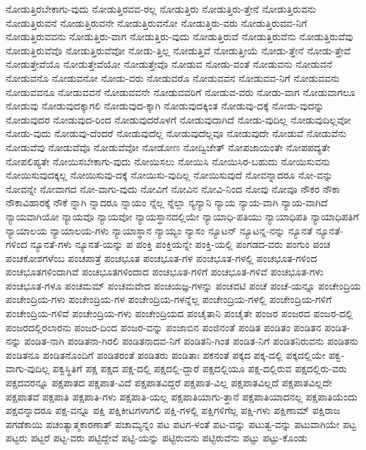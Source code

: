 {ನೋಡುತ್ತಿರಬೇಕಾಗು-ವುದು
ನೋಡುತ್ತಿರವವ-ರಲ್ಲ
ನೋಡುತ್ತಿರು
ನೋಡುತ್ತಿರು-ತ್ತೇನೆ
ನೋಡುತ್ತಿರುವನು
ನೋಡುತ್ತಿರುವನೆ
ನೋಡುತ್ತಿರುವನೇ
ನೋಡುತ್ತಿರುವನೋ
ನೋಡುತ್ತಿರು-ವರು
ನೋಡುತ್ತಿರುವವ-ನಿಗೆ
ನೋಡುತ್ತಿರುವವನು
ನೋಡುತ್ತಿರು-ವಾಗ
ನೋಡುತ್ತಿರು-ವುದು
ನೋಡುತ್ತಿರುವೆ
ನೋಡುತ್ತಿರುವೆನು
ನೋಡುತ್ತಿರುವೆವು
ನೋಡುತ್ತಿರುವೆವೊ
ನೋಡುತ್ತಿರುವೆವೋ
ನೋಡು-ತ್ತಿಲ್ಲ
ನೋಡುತ್ತಿವೆ
ನೋಡುತ್ತೀಯೆ
ನೋಡು-ತ್ತೇನೆ
ನೋಡು-ತ್ತೇವೆ
ನೋಡುತ್ತೇವೆಯೊ
ನೋಡುತ್ತೇವೆಯೋ
ನೋಡುತ್ತೇವೊ
ನೋಡುವ
ನೋಡು-ವಂತೆ
ನೋಡುವನು
ನೋಡುವನೆ
ನೋಡುವನೊ
ನೋಡುವನೋ
ನೋಡು-ವರು
ನೋಡುವರೊ
ನೋಡುವವನ
ನೋಡುವವ-ನಿಗೆ
ನೋಡುವವನು
ನೋಡುವವನೂ
ನೋಡುವವನೆ
ನೋಡುವವನೇ
ನೋಡುವವರಿಗೆ
ನೋಡುವ-ವರು
ನೋಡು-ವಾಗ
ನೋಡುವಾಗಲೂ
ನೋಡುವು
ನೋಡುವುದಕ್ಕಾಗಲಿ
ನೋಡುವುದ-ಕ್ಕಾಗಿ
ನೋಡುವುದಕ್ಕಿಂತ
ನೋಡುವು-ದಕ್ಕೆ
ನೋಡು-ವುದನ್ನು
ನೋಡುವುದರ
ನೋಡುವುದ-ರಿಂದ
ನೋಡುವುದರೊಳಗೆ
ನೋಡುವುದಾಗಿದೆ
ನೋಡು-ವುದಿಲ್ಲ
ನೋಡುವುದಿಲ್ಲವೋ
ನೋಡು-ವುದು
ನೋಡುವು-ದೆಂದರೆ
ನೋಡುವುದೆಲ್ಲ
ನೋಡುವುದೆಲ್ಲವೂ
ನೋಡುವುದೇ
ನೋಡುವೆ
ನೋಡುವೆನು
ನೋಡುವೆವು
ನೋಡುವೆವೊ
ನೋಡುವೆವೋ
ನೋಡೋಣ
ನೋದ್ವಿಜೇತ್
ನೋಪಜಾಯಂತೇ
ನೋಪಪದ್ಯತೇ
ನೋಪಲಿಪ್ಯತೇ
ನೋಯಿಸಬೇಕಾಗು-ವುದು
ನೋಯಿಸಲು
ನೋಯಿಸಿ
ನೋಯಿಸಿರ-ಬಹುದು
ನೋಯಿಸುವನು
ನೋಯಿಸುವುದಕ್ಕಲ್ಲ
ನೋಯಿಸುವು-ದಕ್ಕೆ
ನೋಯಿಸು-ವುದಿಲ್ಲ
ನೋಯಿಸುವುದೆ
ನೋವನ್ನಾದರೂ
ನೋ-ವನ್ನು
ನೋವನ್ನೇ
ನೋವಾಗದ
ನೋ-ವಾಗು-ವುದು
ನೋವಿಗೆ
ನೋವಿನ
ನೋವಿ-ನಿಂದ
ನೋವು
ನೋವೂ
ನೌಕರ
ನೌಕಾ
ನೌಕಾವಿಹಾರಕ್ಕೆ
ನೌಕೆ
ನ್ನಾಗಿ
ನ್ನಾದರೂ
ನ್ನಾಯಂ
ನ್ನೆಲ್ಲ
ನ್ನೆಲ್ಲಾ
ನ್ಯನ್ಯಾನಿ
ನ್ಯಾಯ
ನ್ಯಾಯ-ವಾಗಿ
ನ್ಯಾಯ-ವಾಗಿದೆ
ನ್ಯಾಯವಾಗಿಯೋ
ನ್ಯಾಯವೊ
ನ್ಯಾಯವೋ
ನ್ಯಾಯಸ್ಥಾನದಲ್ಲಿಯೇ
ನ್ಯಾಯಾಧಿ-ಪತಿಯು
ನ್ಯಾಯಾಧಿಪತಿ
ನ್ಯಾಯಾಧಿಪತಿಗೆ
ನ್ಯಾಯಾಲಯ
ನ್ಯಾಯಾಲಯ-ಗಳು
ನ್ಯಾಯಾಸ್ಥಾನ
ನ್ಯಾಯ್ಯಂ
ನ್ಯಾಸಂ
ನ್ಯೂಟನ್
ನ್ಯೂಟನ್ನ-ನನ್ನು
ನ್ಯೂನತೆ
ನ್ಯೂನತೆ-ಗಳಿಂದ
ನ್ಯೂನತೆ-ಗಳು
ನ್ಯೂನತೆ-ಯನ್ನು
ಪ
ಪಂಕ್ತಿ
ಪಂಕ್ತಿಯನ್ನೇ
ಪಂಕ್ತಿ-ಯಲ್ಲಿ
ಪಂಗಡದ-ವರು
ಪಂಗುಂ
ಪಂಚ
ಪಂಚಕೋಶಗಳೆಂಬ
ಪಂಚಪಾತ್ರೆ
ಪಂಚಭೂತ
ಪಂಚಭೂತ-ಗಳ
ಪಂಚಭೂತ-ಗಳಲ್ಲಿ
ಪಂಚಭೂತ-ಗಳಿಂದ
ಪಂಚಭೂತಗಳಿಂದಾಗಿವೆ
ಪಂಚಭೂತಗಳಿಂದಾದ
ಪಂಚಭೂತ-ಗಳಿಗೆ
ಪಂಚಭೂತ-ಗಳಿವೆ
ಪಂಚಭೂತ-ಗಳು
ಪಂಚಭೂತ-ಗಳೂ
ಪಂಚಮಮ್
ಪಂಚಮವೇದ
ಪಂಚಯಜ್ಞ-ಗಳನ್ನು
ಪಂಚವಟಿ
ಪಂಚೆ
ಪಂಚೆ-ಯನ್ನೂ
ಪಂಚೇಂದ್ರಿಯ
ಪಂಚೇಂದ್ರಿಯ-ಗಳು
ಪಂಚೇಂದ್ರಿಯ-ಗಳ
ಪಂಚೇಂದ್ರಿಯ-ಗಳನ್ನೆಲ್ಲ
ಪಂಚೇಂದ್ರಿಯ-ಗಳಲ್ಲಿ
ಪಂಚೇಂದ್ರಿಯ-ಗಳಿಗೆ
ಪಂಚೇಂದ್ರಿಯ-ಗಳಿವೆ
ಪಂಚೇಂದ್ರಿಯ-ಗಳು
ಪಂಚೇಂದ್ರಿಯದ
ಪಂಚೈತಾನಿ
ಪಂಚೈತೇ
ಪಂಜರ
ಪಂಜರದ
ಪಂಜರ-ದಲ್ಲಿ
ಪಂಜರದಲ್ಲಿರಲಾರನು
ಪಂಜರ-ದಿಂದ
ಪಂಜರ-ವನ್ನು
ಪಂಜಾಬಿನ
ಪಂಜಿನಂತೆ
ಪಂಡಿತ
ಪಂಡಿತಂ
ಪಂಡಿತನ
ಪಂಡಿತ-ನನ್ನು
ಪಂಡಿತ-ನಾಗಿ
ಪಂಡಿತನಾ-ಗಿರಲಿ
ಪಂಡಿತನಾದವ-ನಿಗೆ
ಪಂಡಿತನಿ-ಗಿಂತ
ಪಂಡಿತ-ನಿಗೆ
ಪಂಡಿತನಿರುವನು
ಪಂಡಿತನು
ಪಂಡಿತನೂ
ಪಂಡಿತನೊಂದಿಗೆ
ಪಂಡಿತರಂತೆ
ಪಂಡಿತರು
ಪಂಡಿತಾಃ
ಪಕನಂತೆ
ಪಕ್ಕದ
ಪಕ್ಕ-ದಲ್ಲಿ
ಪಕ್ಕದಲ್ಲಿಯೇ
ಪಕ್ವ-ವಾಗು-ವುದಿಲ್ಲ
ಪಕ್ವಸ್ಥಿತಿಗೆ
ಪಕ್ಷ
ಪಕ್ಷದ
ಪಕ್ಷ-ದಲ್ಲಿ
ಪಕ್ಷದಲ್ಲಿ-ದ್ದಾರೆ
ಪಕ್ಷದಲ್ಲಿಯೂ
ಪಕ್ಷ-ದಲ್ಲಿರುವ
ಪಕ್ಷದಲ್ಲಿರು-ವರು
ಪಕ್ಷದವರನ್ನೂ
ಪಕ್ಷಪಾತದ
ಪಕ್ಷಪಾತ-ವಿದೆ
ಪಕ್ಷಪಾತವಿದ್ದರೆ
ಪಕ್ಷಪಾತ-ವಿಲ್ಲ
ಪಕ್ಷಪಾತವಿಲ್ಲದೆ
ಪಕ್ಷಪಾತವಿಲ್ಲದೇ
ಪಕ್ಷಪಾತವೆ
ಪಕ್ಷಪಾತಿ
ಪಕ್ಷಪಾತಿ-ಗಳು
ಪಕ್ಷಪಾತಿ-ಯಲ್ಲ
ಪಕ್ಷಪಾತಿಯಾಗು-ತ್ತಾನೆ
ಪಕ್ಷಪಾತಿಯಾದನಲ್ಲ
ಪಕ್ಷಪಾತಿಯೆಂದು
ಪಕ್ಷವನ್ನಾದರೂ
ಪಕ್ಷ-ವನ್ನೂ
ಪಕ್ಷಿ
ಪಕ್ಷಿಕೀಟಗಳಾಗಲಿ
ಪಕ್ಷಿ-ಗಳಲ್ಲಿ
ಪಕ್ಷಿಗಳಿಗೆಲ್ಲ
ಪಕ್ಷಿ-ಗಳು
ಪಕ್ಷಿಣಾಮ್
ಪಕ್ಷಿರಾಜ
ಪಗಡೆಕಾಯಿ
ಪಚಂತ್ಯಾತ್ಮಕಾರಣಾತ್
ಪಚಾಮ್ಯನ್ನಂ
ಪಟ
ಪಟಗ-ಳಂತೆ
ಪಟ-ವನ್ನು
ಪಟುತ್ವ-ವನ್ನು
ಪಟುವಾಗಿಯೇ
ಪಟ್ಟ
ಪಟ್ಟರು
ಪಟ್ಟರೆ
ಪಟ್ಟ-ವರು
ಪಟ್ಟಿದ್ದೇವೆ
ಪಟ್ಟಿ-ಯನ್ನು
ಪಟ್ಟಿರುವನು
ಪಟ್ಟಿರುವೆನು
ಪಟ್ಟು
ಪಟ್ಟು-ಕೊಂಡು
}
